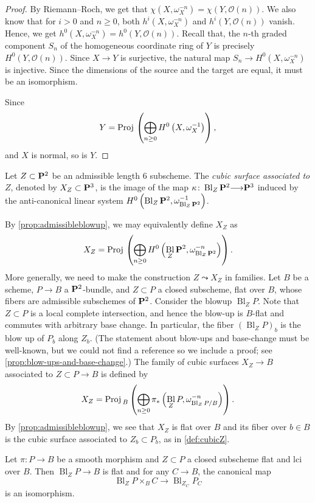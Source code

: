\documentclass[12pt,reqno]{amsart}
\DeclareMathOperator{\Bl}{Bl}
\renewcommand{\to}{{\longrightarrow}}
\numberwithin{equation}{section}
\renewcommand{\O}{\mathcal O}
\newcommand{\Proj}{{\text{\rm Proj}\,}}
\begin{document}
\begin{proof}
  By Riemann--Roch, we get that $\chi(X,\omega_X^{-n}) = \chi(Y, \O(n))$.
  We also know that for $i > 0$ and $n \geq 0$, both $h^i(X, \omega_X^{-n})$ and $h^i(Y, \O(n))$ vanish.
  Hence, we get $h^0(X, \omega_X^{-n}) = h^0(Y, \O(n))$.
  Recall that, the $n$-th graded component $S_n$ of the homogeneous coordinate ring of $Y$ is precisely $H^0(Y, \O(n))$.
  Since $X \to Y$ is surjective, the natural map $S_n \to H^0(X, \omega_X^{-n})$ is injective.
  Since the dimensions of the source and the target are equal, it must be an isomorphism.

  Since
  \[ Y = \Proj\left( \bigoplus_{n \geq 0}H^0\left(X, \omega_X^{-1} \right) \right),\]
  and $X$ is normal, so is $Y$.
\end{proof}

\begin{definition}
  \label{def:cubicZ} Let $Z \subset \P^2$ be an admissible length $6$
  subscheme.  The \emph{cubic surface associated to $Z$}, denoted by
  $X_Z \subset \P^3$, is the image of the map
  $\kappa \colon \Bl_{Z}\P^2 \to \P^3$ induced by the anti-canonical linear system $H^0\left(\Bl_Z\P^2, \omega_{\Bl_Z\P^2}^{-1}\right)$.
\end{definition}
By \autoref{prop:admissibleblowup}, we may equivalently define $X_Z$ as
\[ X_Z = \Proj \left( \bigoplus_{n \geq 0} H^0\left( \Bl_Z\P^2, \omega_{\Bl_Z\P^2}^{-n} \right) \right).\]
More generally, we need to make the construction $Z \leadsto X_Z$ in families.
Let $B$ be a scheme, $P \to B$ a $\P^2$-bundle, and $Z \subset  P$ a closed subscheme, flat over $B$, whose fibers are admissible subschemes of $\P^2$.
Consider the blowup $\Bl_{ Z}  P$.
Note that $Z \subset  P$ is a local complete intersection, and hence the blow-up is $B$-flat and commutes with arbitrary base change.
In particular, the fiber $(\Bl_ZP)_b$ is the blow up of $P_b$ along $Z_b$.
(The statement about blow-ups and base-change must be well-known, but we could not find a reference so we include a proof; see \autoref{prop:blow-ups-and-base-change}.)
The family of cubic surfaces $X_Z \to B$ associated to $Z \subset P \to B$ is defined by
\[
  X_Z = \Proj_B \left(\bigoplus_{n \geq 0}\pi_*\left(\Bl_ZP, \omega_{\Bl_ZP/B}^{-n}\right)\right).
\]
By \autoref{prop:admissibleblowup}, we see that $X_Z$ is flat over $B$
and its fiber over $b \in B$ is the cubic surface associated to
$Z_b \subset P_b$, as in \autoref{def:cubicZ}.
\begin{proposition}\label{prop:blow-ups-and-base-change}
  Let $\pi \colon P \to B$ be a smooth morphism and $Z \subset P$ a closed subscheme flat and lci over $B$.
  Then $\Bl_ZP \to B$ is flat and for any $C \to B$, the canonical map
  \[ \Bl_ZP \times_B C \to \Bl_{Z_C} P_C\]
  is an isomorphism.
\end{proposition}
\end{document}

